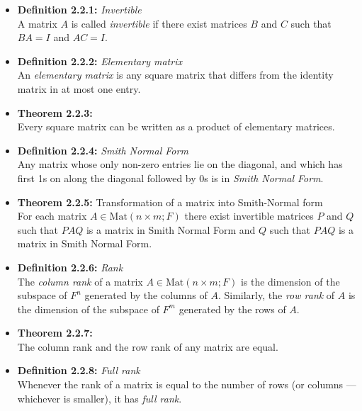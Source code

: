 \documentclass[11pt,a4paper]{article}
\begin{document}
\begin{itemize}

    \item \textbf{Definition 2.2.1:} \emph{Invertible} \\
        A matrix $A$ is called \emph{invertible} if there exist matrices $B$ and $C$ such that
        $BA = I$ and $AC = I$.

    \item \textbf{Definition 2.2.2:} \emph{Elementary matrix} \\
        An \emph{elementary matrix} is any square matrix that differs from the identity matrix
        in at most one entry.

    \item \textbf{Theorem 2.2.3:} \\
        Every square matrix can be written as a product of elementary matrices.

    \item \textbf{Definition 2.2.4:} \emph{Smith Normal Form} \\
        Any matrix whose only non-zero entries lie on the diagonal,
        and which has first 1s on along the diagonal followed by 0s is in \emph{Smith Normal Form}.

    \item \textbf{Theorem 2.2.5:} Transformation of a matrix into Smith-Normal form \\
        For each matrix $A \in \mathrm{Mat}(n \times m; F)$ there exist invertible matrices
        $P$ and $Q$ such that $PAQ$ is a matrix in Smith Normal Form and $Q$ such that $PAQ$ is a
        matrix in Smith Normal Form.

    \item \textbf{Definition 2.2.6:} \emph{Rank} \\
        The \emph{column rank} of a matrix $A \in \mathrm{Mat}(n \times m; F)$
        is the dimension of the subspace of $F^n$ generated by the columns of $A$.
        Similarly, the \emph{row rank} of $A$ is the dimension of the subspace of $F^m$ generated
        by the rows of $A$.

    \item \textbf{Theorem 2.2.7:} \\
        The column rank and the row rank of any matrix are equal.

    \item \textbf{Definition 2.2.8:} \emph{Full rank} \\
        Whenever the rank of a matrix is equal to the number of rows (or columns --- whichever is
        smaller), it has \emph{full rank}.
\end{itemize}
\end{document}
